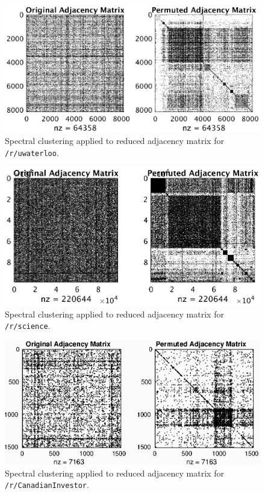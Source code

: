 \documentclass[letterpaper, 10 pt, conference]{ieeeconf}
\theoremstyle{definition}
\begin{document}
\begin{figure}
  \centering
  \includegraphics{figures/uwaterloo.eps}
  \caption{Spectral clustering applied to reduced adjacency matrix for \texttt{/r/uwaterloo}.}
  \label{fig:analysis:cluster1}
\end{figure}
\begin{figure}
  \centering
  \includegraphics{figures/science.eps}
  \caption{Spectral clustering applied to reduced adjacency matrix for \texttt{/r/science}.}
  \label{fig:analysis:cluster2}
\end{figure}
\begin{figure}
  \centering
  \includegraphics{figures/CanadianInvestor.eps}
  \caption{Spectral clustering applied to reduced adjacency matrix for \texttt{/r/CanadianInvestor}.}
  \label{fig:analysis:cluster3}
\end{figure}
\end{document}
